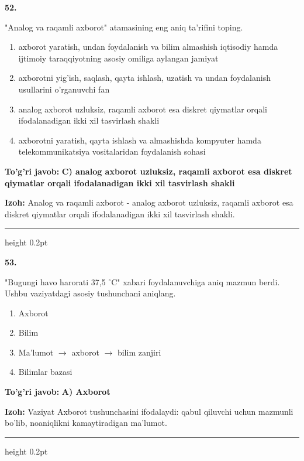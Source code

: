 \documentclass[10pt,a4paper,oneside]{article}
\begin{document}
\noindent\textbf{\color{ink}52.}
\par
"Analog va raqamli axborot" atamasining eng aniq ta'rifini toping.
\begin{enumerate}[label=\Alph*),leftmargin=9mm]
\item axborot yaratish, undan foydalanish va bilim almashish iqtisodiy hamda ijtimoiy taraqqiyotning asosiy omiliga aylangan jamiyat
\item axborotni yig'ish, saqlash, qayta ishlash, uzatish va undan foydalanish usullarini o'rganuvchi fan
\item analog axborot uzluksiz, raqamli axborot esa diskret qiymatlar orqali ifodalanadigan ikki xil tasvirlash shakli
\item axborotni yaratish, qayta ishlash va almashishda kompyuter hamda telekommunikatsiya vositalaridan foydalanish sohasi
\end{enumerate}
\begin{tcolorbox}[enhanced,breakable,colback=teal!4,colframe=teal!50!black,boxrule=0.5pt,arc=1.1mm,left=3mm,right=3mm,top=1.7mm,bottom=1.7mm,before skip=2mm,after skip=2mm]
\textbf{\color{teal}To'g'ri javob:} \textbf{C) analog axborot uzluksiz, raqamli axborot esa diskret qiymatlar orqali ifodalanadigan ikki xil tasvirlash shakli}
\par\smallskip
\textbf{Izoh:} Analog va raqamli axborot - analog axborot uzluksiz, raqamli axborot esa diskret qiymatlar orqali ifodalanadigan ikki xil tasvirlash shakli.
\end{tcolorbox}
\vspace{2mm}\hrule height 0.2pt \vspace{3mm}

\noindent\textbf{\color{ink}53.}
\par
"Bugungi havo harorati 37,5 \ensuremath{^\circ}C" xabari foydalanuvchiga aniq mazmun berdi. Ushbu vaziyatdagi asosiy tushunchani aniqlang.
\begin{enumerate}[label=\Alph*),leftmargin=9mm]
\item Axborot
\item Bilim
\item Ma'lumot \ensuremath{\to} axborot \ensuremath{\to} bilim zanjiri
\item Bilimlar bazasi
\end{enumerate}
\begin{tcolorbox}[enhanced,breakable,colback=teal!4,colframe=teal!50!black,boxrule=0.5pt,arc=1.1mm,left=3mm,right=3mm,top=1.7mm,bottom=1.7mm,before skip=2mm,after skip=2mm]
\textbf{\color{teal}To'g'ri javob:} \textbf{A) Axborot}
\par\smallskip
\textbf{Izoh:} Vaziyat Axborot tushunchasini ifodalaydi: qabul qiluvchi uchun mazmunli bo'lib, noaniqlikni kamaytiradigan ma'lumot.
\end{tcolorbox}
\vspace{2mm}\hrule height 0.2pt \vspace{3mm}
\end{document}
